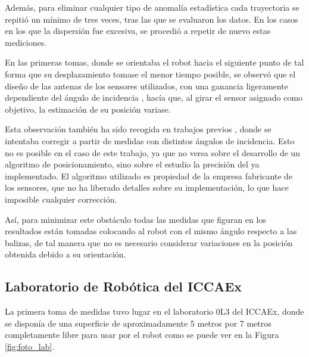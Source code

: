 Además, para eliminar cualquier tipo de anomalía estadística cada trayectoria se repitió un mínimo de tres veces, tras las que se evaluaron los datos.
En los casos en los que la dispersión fue excesiva, se procedió a repetir de nuevo estas mediciones.

En las primeras tomas, donde se orientaba el robot hacia el siguiente punto de tal forma que su desplazamiento tomase el menor tiempo posible, se observó que el diseño de las antenas de los sensores utilizados, con una ganancia ligeramente dependiente del ángulo de incidencia \cite{ang}, hacía que, al girar el sensor asignado como objetivo, la estimación de su posición variase.

Esta observación también ha sido recogida en trabajos previos \cite{MSTesis}, donde se intentaba corregir a partir de medidas con distintos ángulos de incidencia.
Esto no es posible en el caso de este trabajo, ya que no versa sobre el desarrollo de un algoritmo de posicionamiento, sino sobre el estudio la precisión del ya implementado.
El algoritmo utilizado es propiedad de la empresa fabricante de los sensores, que no ha liberado detalles sobre su implementación, lo que hace imposible cualquier corrección.

Así, para minimizar este obstáculo todas las medidas que figuran en los resultados están tomadas colocando al robot con el mismo ángulo respecto a las balizas, de tal manera que no es necesario considerar variaciones en la posición obtenida debido a su orientación.

\subsection{Laboratorio de Robótica del ICCAEx}

La primera toma de medidas tuvo lugar en el laboratorio 0L3 del ICCAEx, donde se disponía de una superficie de aproximadamente 5 metros por 7 metros completamente libre para usar por el robot como se puede ver en la Figura \ref{fig:foto_lab}.

